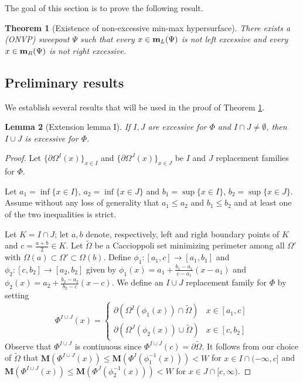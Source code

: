 \documentclass[12pt,twoside]{amsart}
\numberwithin{equation}{section}
\renewcommand{\leq}{\leqslant}
\newtheorem{theorem}{Theorem}[section]
\newtheorem{lemma}[theorem]{Lemma}
\newcommand{\Om}{\Omega}
\newcommand{\mm}{{\bf m}}
\newcommand{\bM}{\mathbf{M}}
\begin{document}
 
 The goal of this section is to prove the following result.

\begin{theorem}[Existence of non-excessive min-max hypersurface]\label{c:non-excessive_minmax}
There exists a (ONVP) sweepout $\Psi$ such that every $x\in \mm_L(\Psi)$ is not left excessive and every $x \in \mm_R(\Psi)$ is not right excessive. 
\end{theorem}

\subsection{Preliminary results} We establish several results that will be used in the proof of Theorem \ref{c:non-excessive_minmax}. 






\begin{lemma}[Extension lemma I]\label{l:union-excessive}
If $I,J$ are excessive for $\Phi$ and $I \cap J \not = \emptyset$, then $I \cup J$ is excessive for $\Phi$. 
\end{lemma}
\begin{proof}
Let $\{\partial \Om^I(x) \}_{x \in I}$
and $\{\partial \Om^J(x) \}_{x \in J}$
be $I$ and $J$ replacement families
for $\Phi$.

Let $a_1 = \inf\{x \in I\} $, $a_2 = \inf\{x \in J\}$ and $b_1 = \sup\{x \in I\} $, $b_2 = \sup\{x \in J\}$.
Assume without any loss of generality that
$a_1\leq a_2$ and $b_1 \leq b_2$
and at least one of the two inequalities
is strict.

Let $K = I \cap J$; let $a,b$ denote, respectively, left and right
boundary points of $K$ and $c = \frac{a+b}{2}\in K$.
Let $\tilde{\Om}$ be a Caccioppoli set minimizing perimeter among all $\Om'$
with $\Om(a) \subset \Om' \subset \Om(b)$.
Define $\phi_1:[a_1,c] \rightarrow [a_1,b_1]$
and $\phi_2:[c,b_2] \rightarrow [a_2,b_2]$
given by $\phi_1(x)=a_1+\frac{b_1-a_1}{c-a_1}(x-a_1)$
and $\phi_2(x)=a_2 + \frac{b_2-a_2}{b_2-c}(x-c)$.
We define an $I\cup J$ replacement family for
$\Phi$ by setting
\[
\Phi^{I\cup J}(x) = \begin{cases} 
\partial (\Om^I(\phi_1(x)) \cap \tilde{\Om}) & x \in [a_1,c]\\
\partial (\Om^J(\phi_2(x)) \cup \tilde{\Om}) & x \in [c,b_2]
\end{cases}
\]
Observe that $\Phi^{I\cup J}$
is continuous since $\Phi^{I\cup J}(c) = \partial \tilde{\Om}$.
It follows from our choice of $\tilde{\Om}$ that
$\bM(\Phi^{I\cup J}(x))\leq \bM(\Phi^I(\phi_1^{-1}(x)))<W$
for $x \in I \cap (-\infty, c] $ and 
$\bM(\Phi^{I\cup J}(x))\leq \bM(\Phi^J(\phi_2^{-1}(x)))<W$
for $x \in J \cap [c, \infty) $. 
\end{proof}
\end{document}
